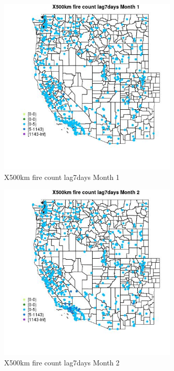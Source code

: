 \begin{figure} 
\centering  
\includegraphics[width=0.77\textwidth]{Code_Outputs/Report_ML_input_PM25_Step4_part_e_de_duplicated_aves_compiled_2019-05-14wNAs_MapObsMo1X500km_fire_count_lag7days.jpg} 
\caption{\label{fig:Report_ML_input_PM25_Step4_part_e_de_duplicated_aves_compiled_2019-05-14wNAsMapObsMo1X500km_fire_count_lag7days}X500km fire count lag7days Month 1} 
\end{figure} 
 

\begin{figure} 
\centering  
\includegraphics[width=0.77\textwidth]{Code_Outputs/Report_ML_input_PM25_Step4_part_e_de_duplicated_aves_compiled_2019-05-14wNAs_MapObsMo2X500km_fire_count_lag7days.jpg} 
\caption{\label{fig:Report_ML_input_PM25_Step4_part_e_de_duplicated_aves_compiled_2019-05-14wNAsMapObsMo2X500km_fire_count_lag7days}X500km fire count lag7days Month 2} 
\end{figure} 
 


